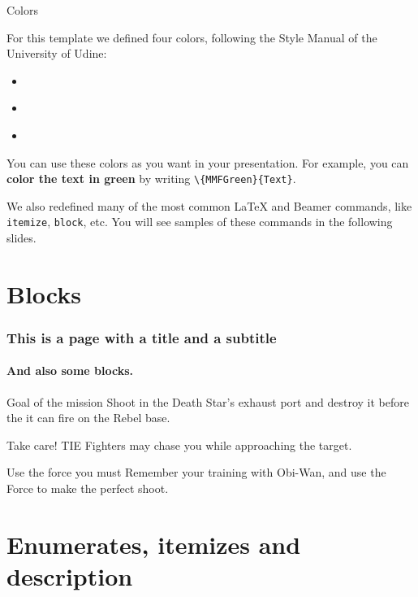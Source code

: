 \documentclass[usenames,dvipsnames,]{beamer}
\begin{document}
\begin{frame}{Colors}

For this template we defined four colors, following the Style Manual of the University of Udine:
\begin{itemize}
\item \textcolor{white}{}
\item \textcolor{white}{}
\item \textcolor{white}{}
\end{itemize}

\vskip 0.5cm

You can use these colors as you want in your presentation. For example, you can \textbf{\textcolor{MMFGreen}{color the text in green}} by writing \texttt{\textbackslash\{MMFGreen\}\{Text\}}.

\vskip 0.5cm

We also redefined many of the most common \LaTeX{} and Beamer commands, like \texttt{itemize}, \texttt{block}, etc. You will see samples of these commands in the following slides.

\end{frame}

\section{Blocks}

\begin{frame} 
\frametitle{This is a page with a title and a subtitle} 
\framesubtitle{And also some blocks.} 
\begin{block}{Goal of the mission}
Shoot in the Death Star's exhaust port and destroy it before the it can fire on the Rebel base.
\end{block} 
\begin{alertblock}{Take care!}
TIE Fighters may chase you while approaching the target.
\end{alertblock} 
\begin{exampleblock}{Use the force you must}
Remember your training with Obi-Wan, and use the Force to make the perfect shoot.
\end{exampleblock} 

\end{frame}

\section{Enumerates, itemizes and description}
\end{document}
